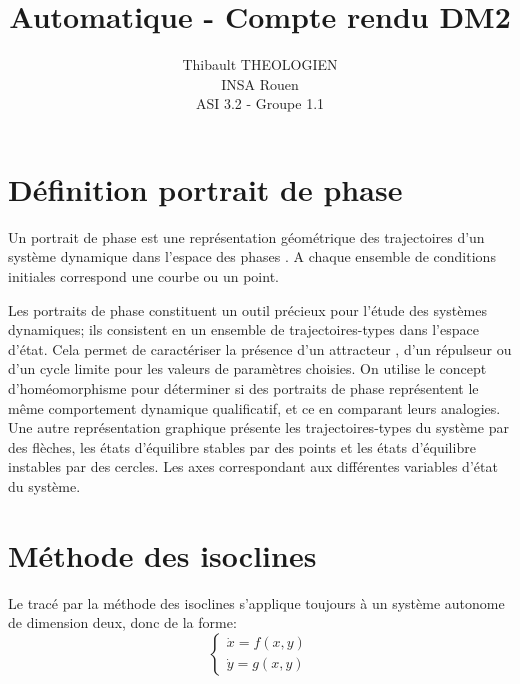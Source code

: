 \documentclass[a4paper,12pt]{article}
\title{Automatique - Compte rendu DM2}
\author{Thibault THEOLOGIEN\\
        INSA Rouen\\
        ASI 3.2 - Groupe 1.1}
\begin{document}
	\maketitle
	\tableofcontents
	\newpage

  \section{Définition portrait de phase}
    \label{sec:Définition portrait de phase}
    Un portrait de phase est une représentation géométrique des trajectoires d'un système dynamique dans l'espace des phases \footnotemark[1].
    A chaque ensemble de conditions initiales correspond une courbe ou un point.

    Les portraits de phase constituent un outil précieux pour l'étude des systèmes dynamiques; ils consistent en un ensemble de trajectoires-types dans l'espace d'état.
    Cela permet de caractériser la présence d'un attracteur \footnotemark[2], d'un répulseur ou d'un cycle limite \footnotemark[3] pour les valeurs de paramètres choisies.
    On utilise le concept d'homéomorphisme \footnotemark[4] pour déterminer si des portraits de phase représentent le même comportement dynamique qualificatif, et ce en comparant leurs analogies.
    Une autre représentation graphique présente les trajectoires-types du système par des flèches, les états d'équilibre stables par des points et les états d'équilibre instables par des cercles.
    Les axes correspondant aux différentes variables d'état du système.

    \newpage

  \section{Méthode des isoclines}
  \label{sec:Méthode des isoclines}
    Le tracé par la méthode des isoclines s'applique toujours à un système autonome de dimension deux, donc de la forme:
    \[\left\{
              \begin{array}{ll}
                \dot{x} = f(x,y)\\
                \dot{y} = g(x,y)
              \end{array}
      \right.
    \]
\end{document}

